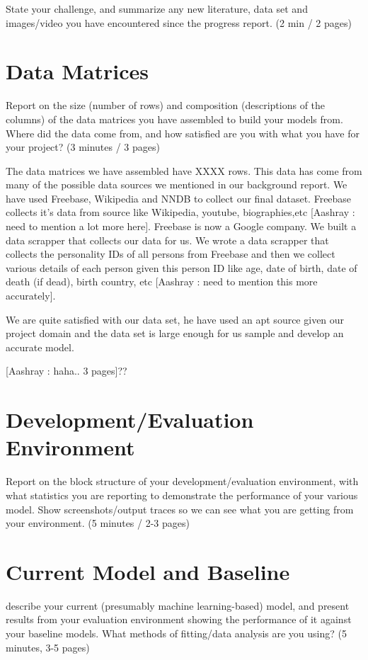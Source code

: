 \documentclass[runningheads]{llncs}
\begin{document}
State your challenge, and summarize any new literature, data set and images/video you have encountered since the progress report.  (2 min / 2 pages)

\section{Data Matrices}

Report on the size (number of rows) and composition (descriptions of the columns) of the data matrices you have assembled to build your models from.  Where did the data come from, and how satisfied are you with what you have for your project? 
(3 minutes / 3 pages)

The data matrices we have assembled have XXXX rows. This data has come from many of the possible data sources we mentioned in 
our background report. We have used Freebase, Wikipedia and NNDB to collect our final dataset. Freebase collects it's data from source 
like Wikipedia, youtube, biographies,etc [Aashray : need to mention a lot more here]. Freebase is now a Google company. We built a data scrapper 
that collects our data for us. We wrote a data scrapper that collects the personality IDs of all persons from Freebase and then we collect 
various details of each person given this person ID like age, date of birth, date of death (if dead), birth country, etc [Aashray : need to mention this more accurately]. 

We are quite satisfied with our data set, he have used an apt source given our project domain and the data set is large enough for us sample and develop an accurate model.

[Aashray : haha.. 3 pages]??

\section{Development/Evaluation Environment}

Report on the block structure of your development/evaluation environment, with what statistics you are reporting to demonstrate the performance of your various model.  Show screenshots/output traces so we can see what you are getting from your environment. (5 minutes / 2-3 pages)


\section{Current Model and Baseline}

describe your current (presumably machine learning-based) model, and present results from your evaluation environment showing the performance of it against your baseline models. What methods of fitting/data analysis are you using? (5 minutes, 3-5 pages)
\end{document}
